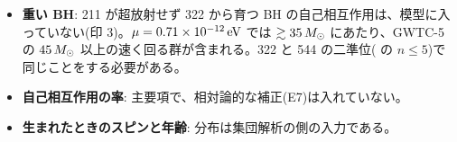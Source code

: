 \begin{caveat}
\begin{itemize}
\item \textbf{重い BH}: 211 が超放射せず 322 から育つ BH の自己相互作用は、模型に入っていない(印 3)。$\mu=0.71\times10^{-12}\,\mathrm{eV}$ では $\gtrsim35\,M_\odot$ にあたり、GWTC-5 の $45\,M_\odot$ 以上の速く回る群が含まれる。322 と 544 の二準位( の $n\le5$)で同じことをする必要がある。
\item \textbf{自己相互作用の率}: 主要項で、相対論的な補正(E7)は入れていない。
\item \textbf{生まれたときのスピンと年齢}: 分布は集団解析の側の入力である。
\end{itemize}
\end{caveat}
